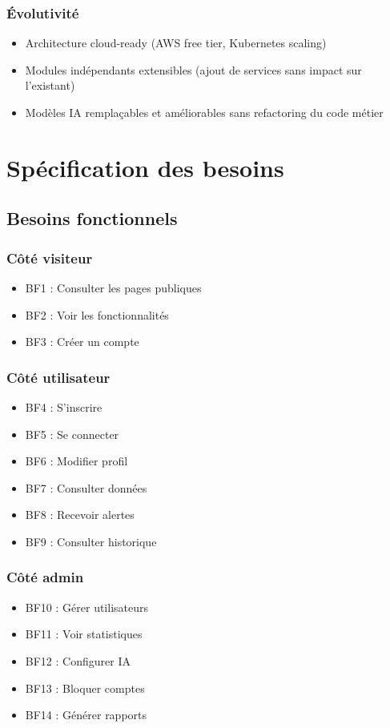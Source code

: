 \documentclass[12pt,a4paper]{report}
\begin{document}
\subsection*{Évolutivité}
\begin{itemize}[leftmargin=*,label=--]
\item Architecture cloud-ready (AWS free tier, Kubernetes scaling)
\item Modules indépendants extensibles (ajout de services sans impact sur l'existant)
\item Modèles IA remplaçables et améliorables sans refactoring du code métier
\end{itemize}

\chapter{Spécification des besoins}

\section{Besoins fonctionnels}

\subsection*{Côté visiteur}
\begin{itemize}[leftmargin=*,label=--]
\item BF1 : Consulter les pages publiques
\item BF2 : Voir les fonctionnalités
\item BF3 : Créer un compte
\end{itemize}

\subsection*{Côté utilisateur}
\begin{itemize}[leftmargin=*,label=--]
\item BF4 : S'inscrire
\item BF5 : Se connecter
\item BF6 : Modifier profil
\item BF7 : Consulter données
\item BF8 : Recevoir alertes
\item BF9 : Consulter historique
\end{itemize}

\subsection*{Côté admin}
\begin{itemize}[leftmargin=*,label=--]
\item BF10 : Gérer utilisateurs
\item BF11 : Voir statistiques
\item BF12 : Configurer IA
\item BF13 : Bloquer comptes
\item BF14 : Générer rapports
\end{itemize}
\end{document}
